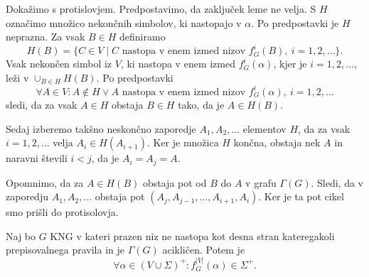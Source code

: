 \documentclass[fin1, tisk]{fmfdelo}
\providecommand{\abs}[1]{\left\lvert #1 \right\rvert}
\theoremstyle{definition}
\begin{document}
\begin{dokaz}
    Dokažimo s protislovjem. Predpostavimo, da zaključek leme ne velja. S $H$ označimo množico 
    nekončnih simbolov, ki nastopajo v $\alpha$. Po predpostavki je $H$ neprazna. Za vsak 
    $B \in H$ definiramo 
    \[
        H(B) = \{ C \in V \mid C \text{ nastopa v enem izmed nizov } f^i_G(B), \ i= 1, 2, \ldots \}.
    \]
    Vsak nekončen simbol iz $V$, ki nastopa v enem izmed $f^i_G(\alpha)$, kjer je $i= 1, 2, \ldots$,
    leži v $\cup_{B \in H}H(B)$. Po predpostavki
    \[
        \forall A \in V \colon A \notin H \vee A \text{ nastopa v enem izmed nizov } f^i_G(\alpha),
        \ i= 1, 2, \ldots
    \]
    sledi, da za vsak $A \in H$ obstaja $B \in H$ tako, da je $A \in H(B)$.

    Sedaj izberemo takšno neskončno zaporedje $A_1, A_2, \ldots$ elementov $H$, da za vsak
    $i= 1, 2, \ldots$ velja $A_i \in H(A_{i+1})$. Ker je množica $H$ končna, obstaja nek 
    $A$ in naravni števili $i < j$, da je $A_{i} = A_{j} = A$.

    Opomnimo, da za $A \in H(B)$ obstaja pot od $B$ do $A$ v grafu $\Gamma(G)$. 
    Sledi, da v zaporedju $A_1, A_2, \ldots$ obstaja pot $(A_j, A_{j-1}, \ldots, A_{i+1}, A_i)$.
    Ker je ta pot cikel smo prišli do protisolovja.
\end{dokaz}

\begin{lema}\label{lema:izračun}
    Naj bo $G$ KNG v kateri prazen niz ne nastopa kot desna stran 
    kateregakoli prepisovalnega pravila in je $\Gamma(G)$ acikličen. Potem je
    \[
        \forall \alpha \in ( V \cup \Sigma)^+ \colon f^{\abs{V}}_G(\alpha) \in \Sigma^+.
    \]
\end{lema}
\end{document}

